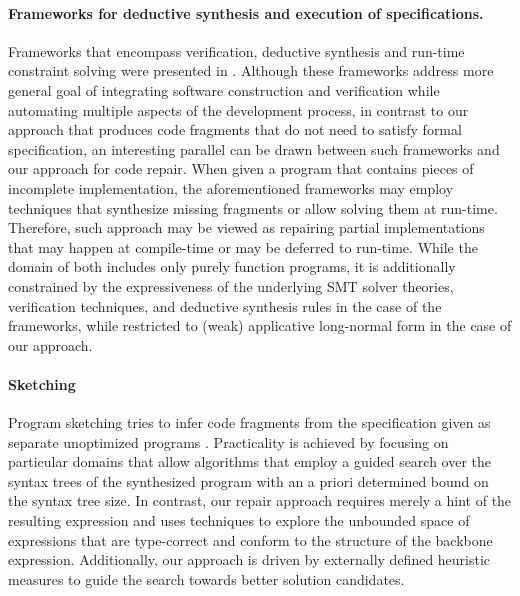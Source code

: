 \paragraph{{\bf Frameworks for deductive synthesis and execution of
specifications.}} Frameworks that encompass verification, deductive
synthesis and run-time constraint solving were presented in
\cite{KuncakETAL13ExecutingSpecificationsSynthesisConstraintSolvingInvitedTalk,KneussETAL13SynthesisModuloRecursiveFunctions}.
Although these frameworks address more general goal of integrating software construction
and verification while automating multiple aspects of the development process,
in contrast to our approach that produces code fragments that do not need
to satisfy formal specification, an interesting parallel can be drawn between
such frameworks and our approach for code repair.
When given a program that contains pieces of incomplete implementation, the
aforementioned frameworks may employ techniques that synthesize missing
fragments or allow solving them at run-time.
Therefore, such approach may be viewed as repairing partial implementations
that may happen at compile-time or may be deferred to run-time.
While the domain of both includes only purely function programs, it is additionally
constrained by the expressiveness of the underlying SMT solver theories, verification
techniques, and deductive synthesis rules in the case of the frameworks, while restricted
to (weak) applicative long-normal form in the case of our approach.

\vspace{-0.5em}
\paragraph{{\bf Sketching}}
Program sketching tries to infer code fragments from the specification
given as separate unoptimized programs
\cite{Solar-Lezama:2007:SS:1250734.1250754,Solar-Lezama:2006:CSF:1168919.1168907}.
Practicality is achieved by focusing on particular domains that allow algorithms
that employ a guided search over the syntax trees of the synthesized program with an a priori
determined bound on the syntax tree size.
In contrast, our repair approach requires merely a hint of the resulting
expression and uses techniques to explore the unbounded space of expressions
that are type-correct and conform to the structure of the backbone expression.
Additionally, our approach is driven by externally defined
heuristic measures to guide the search towards better solution candidates.